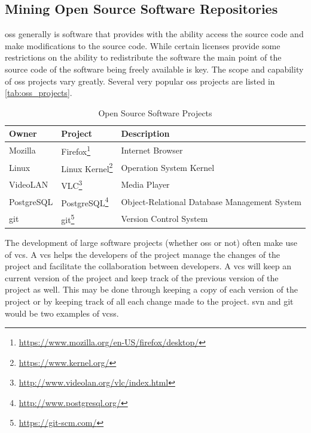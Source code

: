 \subsection{Mining Open Source Software Repositories}

\gls{oss} generally is software that provides with the ability access the source code and make modifications to the source code. While certain licenses provide some restrictions on the ability to redistribute the software the main point of the source code of the software being freely available is key. The scope and capability of \gls{oss} projects vary greatly. Several very popular \gls{oss} projects are listed in \autoref{tab:oss_projects}.

\begin{table}[h!]
\begin{minipage}{\textwidth}
\begin{center}
    \begin{tabular}{|l|l|l|}
        \hline
        Owner & Project & Description \\
        \hline
        Mozilla & Firefox\footnote{\url{https://www.mozilla.org/en-US/firefox/desktop/}} & Internet Browser \\
        Linux & Linux Kernel\footnote{\url{https://www.kernel.org/}} & Operation System Kernel \\
        VideoLAN & VLC\footnote{\url{http://www.videolan.org/vlc/index.html}} & Media Player \\
        PostgreSQL & PostgreSQL\footnote{\url{http://www.postgresql.org/}} & Object-Relational Database Management System \\
        git & git\footnote{\url{https://git-scm.com/}} & Version Control System \\
        \hline
    \end{tabular}
\end{center}
\caption{Open Source Software Projects}
\label{tab:oss_projects}
\end{minipage}
\end{table}

The development of large software projects (whether \gls{oss} or not) often make use of \gls{vcs}. A \gls{vcs} helps the developers of the project manage the changes of the project and facilitate the collaboration between developers. A \gls{vcs} will keep an current version of the project and keep track of the previous version of the project as well. This may be done through keeping a copy of each version of the project or by keeping track of all each change made to the project. \gls{svn} and git would be two examples of \gls{vcs}s.

